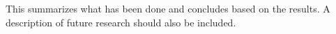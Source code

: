
This summarizes what has been done and concludes based on the results. A description of future research should also be included.

\begin{comment}
Important points:

* Non-interactive
* Computationally/Unconditionally secure
* No central trusted party
* Shuffled send
* Security goals: integrity, anonymity, accountability (See dissent 2.3)
* Attack model (dissent 2.3)
* Assumptions, highlight difference between them (Faulty nodes never silent, ..., dissent 2.4)

Sections:

* 88: Base protocol
* 89: Disco (unconditional untraceability, computationally secure serviceability)
* 89: Waidner (Unreliable channel)
* 90: Detection of disruptors
* (03: Herbivore)
* 03: k-anonymity (maybe this is related work instead? weakens security goals to gain efficiency). Small DC subnets.
* 04: dc-revisited (proactive accountability. efficient cheater detection + recovery)
* 10: Dissent
* 13: Verdict

Definitions:

* Anonymity set
* Anonymity terms (cite def paper)
* Anonymity game (dissent [7])
* k-anonymity (k-anonymity)
* Robustness? (k-anonymity 3.3)
* (Partial, Full) Collusion
* Disruption
* Anytrust assumption
* Zero knowledge proofs

Attacks:

* Sybil (dissent [17])
* Sock puppetry (dissent [36])
* Traffic analysis (verdict [4, 34, 38])

Related work:

* Mix nets
* Crowds (dissent [29])
* CliqueNet (k-anon [17])
* Verifiable shuffles
* Group signatures, ring signatures
* Herbivore

Random notes:

* k-anonymous provide anonymity only when most members are honest (see dissent, related work)
* Herbivore provides anonymity only within small subgroups

\end{comment}
